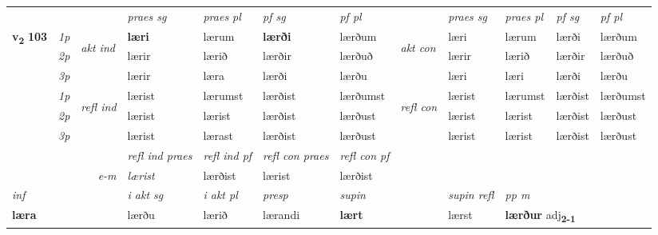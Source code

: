 \begin{longtable}[l]{X>{\footnotesize\itshape}llXXXXlXXXX}
 & &   & \textit{praes sg}  & \textit{praes pl}    & \textit{ pf sg} & \textit{pf pl} & & \textit{praes sg}  & \textit{praes pl}    & \textit{pf sg} & \textit{pf pl }  \\ \cmidrule{4-7} \cmidrule{9-12}
 \multirow{2}{*}{{{\textbf{v{\textsubscript{2}}} \Large{\textbf{103}}}}}  & 1p & \multirow{3}{*}{\begin{turn}{90}\textit{akt ind}\end{turn}} & \textbf{læri} & lærum & \textbf{lærði} & lærðum & \multirow{3}{*}{\begin{turn}{90}\textit{akt con}\end{turn}} &læri & lærum & lærði & lærðum\\*
 & 2p &  &  lærir  & lærið & lærðir & lærðuð & & lærir & lærið & lærðir & lærðuð \\*
 & 3p &  & lærir & læra & lærði & lærðu & & læri & læri& lærði & lærðu \\*
\cmidrule{4-7} \cmidrule{9-12}
 & 1p & \multirow{3}{*}{\begin{turn}{90}\textit{refl ind}\end{turn}}  & lærist & lærumst & lærðist & lærðumst & \multirow{3}{*}{\begin{turn}{90}\textit{refl con}\end{turn}}  &lærist & lærumst & lærðist & lærðumst \\*
 & 2p &  & lærist & lærist & lærðist & lærðust & &lærist & lærist & lærðist & lærðust \\*
 & 3p  & & lærist & lærast & lærðist & lærðust & & lærist & lærist& lærðist & lærðust \\*
\cmidrule{4-7} \cmidrule{9-12}

 & && \textit{refl ind praes} & \textit{refl ind pf} & \textit{refl con praes} & \textit{refl con pf} \\*
\multicolumn{3}{r}{\textit{e-m}}& lærist & lærðist & lærist & lærðist \\*

\cmidrule{4-7}
   {\textit{inf}} & &  & \textit{i akt sg} & \textit{i akt pl}   & \textit{presp} & \textit{supin} && \textit{supin refl} & \textit{pp m} \\*
  {\textbf{læra}} & && lærðu  & lærið   & lærandi &  \textbf{lært} && lærst & \multicolumn{2}{l}{\textbf{lærður} adj\textbf{\textsubscript{2-1}}} \\*

\midrule


\end{longtable}
